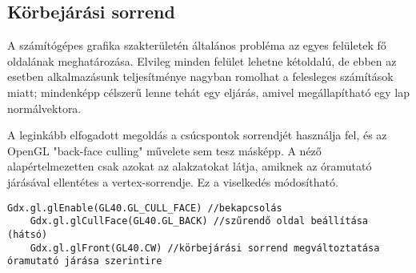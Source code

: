 \subsection{Körbejárási sorrend}

A számítógépes grafika szakterületén általános probléma az egyes felületek fő oldalának meghatározása. Elvileg minden felület lehetne kétoldalú, de ebben az esetben alkalmazásunk teljesítménye nagyban romolhat a felesleges számítások miatt; mindenképp célszerű lenne tehát egy eljárás, amivel megállapítható egy lap normálvektora.

A leginkább elfogadott megoldás a csúcspontok sorrendjét használja fel, és az OpenGL "back-face culling" művelete sem tesz másképp. A néző alapértelmezetten csak azokat az alakzatokat látja, amiknek az óramutató járásával ellentétes a vertex-sorrendje. Ez a viselkedés módosítható.

\begin{lstlisting}[caption=Példa az OpenGL culling műveleteinek beállításaira libGDX-en keresztül]
    Gdx.gl.glEnable(GL40.GL_CULL_FACE) //bekapcsolás
    Gdx.gl.glCullFace(GL40.GL_BACK) //szűrendő oldal beállítása (hátsó)
    Gdx.gl.glFront(GL40.CW) //körbejárási sorrend megváltoztatása óramutató járása szerintire
\end{lstlisting}